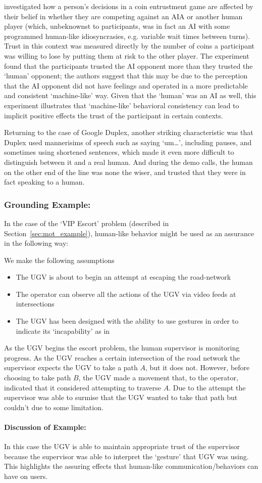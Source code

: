 \citet{Wu2016-ei} investigated how a person's decisions in a coin entrustment game are affected by their belief in whether they are competing against an AIA or another human player (which, unbeknownst to participants, was in fact an AI with some programmed human-like idiosyncrasies, e.g. variable wait times between turns). Trust in this context was measured directly by the number of coins a participant was willing to lose by putting them at risk to the other player. The experiment found that the participants trusted the AI opponent more than they trusted the `human' opponent; the authors suggest that this may be due to the perception that the AI opponent did not have feelings and operated in a more predictable and consistent `machine-like' way. Given that the `human' was an AI as well, this experiment illustrates that `machine-like' behavioral consistency can lead to implicit positive effects the trust of the participant in certain contexts.

Returning to the case of Google Duplex, another striking characteristic was that Duplex used mannerisims of speech such as saying `um\ldots', including pauses, and sometimes using shortened sentences, which made it even more difficult to distinguish between it and a real human. And during the demo calls, the human on the other end of the line was none the wiser, and trusted that they were in fact speaking to a human.

\subsubsection{Grounding Example:}
In the case of the `VIP Escort' problem (described in Section~\ref{sec:mot_example}), human-like behavior might be used as an assurance in the following way:

We make the following assumptions

\begin{itemize}
    \item The UGV is about to begin an attempt at escaping the road-network
    \item The operator can observe all the actions of the UGV via video feeds at intersections
    \item The UGV has been designed with the ability to use gestures in order to indicate its `incapability' as in \cite{Kwon2018-xt}
\end{itemize}

As the UGV begins the escort problem, the human supervisor is monitoring progress. As the UGV reaches a certain intersection of the road network the supervisor expects the UGV to take a path $A$, but it does not. However, before choosing to take path $B$, the UGV made a movement that, to the operator, indicated that it considered attempting to traverse $A$. Due to the attempt the supervisor was able to surmise that the UGV wanted to take that path but couldn't due to some limitation.

\paragraph{\textbf{Discussion of Example:}} In this case the UGV is able to maintain appropriate trust of the supervisor because the supervisor was able to interpret the `gesture' that UGV was using. This highlights the assuring effects that human-like communication/behaviors can have on users.
